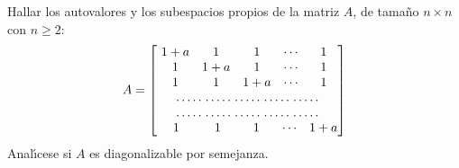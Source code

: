 \begin{enunciado}
 Hallar los autovalores y los subespacios propios de la matriz $A$, de tama\~no $n\times n$ con $n \geq 2$:
 \begin{equation*}
  A = 
  \begin{matrix}
   \begin{bmatrix}
    \begin{matrix}
     1 + a & 1     & 1     & \cdots & \phantom{+} 1\phantom{a} \\
     1     & 1 + a & 1     & \cdots & \phantom{+} 1\phantom{a} \\
     1     & 1     & 1 + a & \cdots & \phantom{+} 1\phantom{a}
    \end{matrix} \\
    \dotfill\hspace{-2pt}\dotfill\hspace{-2pt}\dotfill\hspace{-2pt}\dotfill\hspace{-2pt}\dotfill \\
    \dotfill\hspace{-2pt}\dotfill\hspace{-2pt}\dotfill\hspace{-2pt}\dotfill\hspace{-2pt}\dotfill \\
    \begin{matrix}
     \phantom{+1} 1\phantom{1a} & \phantom{+} 1\;\phantom{a} & \phantom{+} 1\;\phantom{a} & \cdots & 1 + a 
    \end{matrix}
   \end{bmatrix}
  \end{matrix}
 \end{equation*}
 Anal\'{\i}cese si $A$ es diagonalizable por semejanza.
\end{enunciado}

